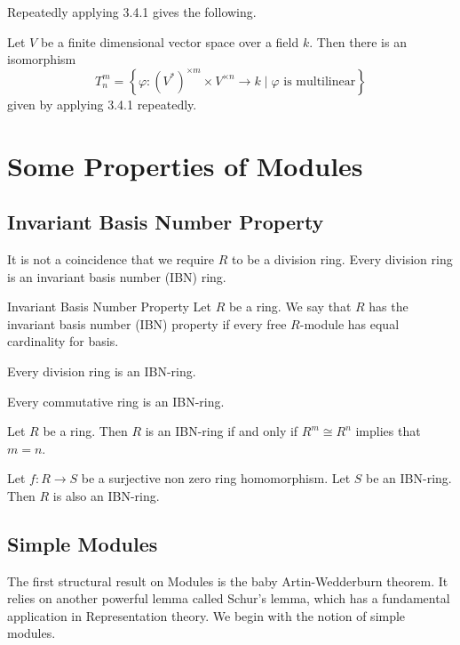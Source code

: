 \documentclass[a4paper]{article}
\begin{document}
Repeatedly applying 3.4.1 gives the following. 

\begin{thm}{}{} Let $V$ be a finite dimensional vector space over a field $k$. Then there is an isomorphism $$T_n^m=\left\{\varphi:(V^\ast)^{\times m}\times V^{\times n}\to k\;|\;\varphi\text{ is multilinear}\right\}$$ given by applying 3.4.1 repeatedly. 
\end{thm}

\pagebreak
\section{Some Properties of Modules}
\subsection{Invariant Basis Number Property}
It is not a coincidence that we require $R$ to be a division ring. Every division ring is an invariant basis number (IBN) ring. 

\begin{defn}{Invariant Basis Number Property}{} Let $R$ be a ring. We say that $R$ has the invariant basis number (IBN) property if every free $R$-module has equal cardinality for basis. 
\end{defn}

\begin{prp}{}{} Every division ring is an IBN-ring. 
\end{prp}

\begin{prp}{}{} Every commutative ring is an IBN-ring. 
\end{prp}

\begin{prp}{}{} Let $R$ be a ring. Then $R$ is an IBN-ring if and only if $R^m\cong R^n$ implies that $m=n$. 
\end{prp}

\begin{prp}{}{} Let $f:R\to S$ be a surjective non zero ring homomorphism. Let $S$ be an IBN-ring. Then $R$ is also an IBN-ring. 
\end{prp}

\subsection{Simple Modules}
The first structural result on Modules is the baby Artin-Wedderburn theorem. It relies on another powerful lemma called Schur's lemma, which has a fundamental application in Representation theory. We begin with the notion of simple modules. 
\end{document}
